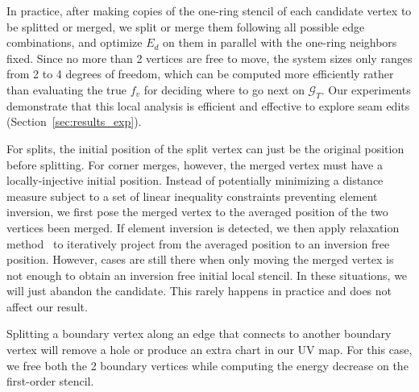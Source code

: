 In practice, after making copies of the one-ring stencil of each candidate vertex to be splitted or merged, we split or merge them following all possible edge combinations, and optimize $E_d$ on them in parallel with the one-ring neighbors fixed. Since no more than 2 vertices are free to move, the system sizes only ranges from 2 to 4 degrees of freedom, which can be computed more efficiently rather than evaluating the true $f_v$ for deciding where to go next on $\mathcal{G}_T$. Our experiments demonstrate that this local analysis is efficient and effective to explore seam edits (Section~\ref{sec:results_exp}).

For splits, the initial position of the split vertex can just be the original position before splitting. For corner merges, however, the merged vertex must have a locally-injective initial position. Instead of potentially minimizing a distance measure subject to a set of linear inequality constraints preventing element inversion, we first pose the merged vertex to the averaged position of the two vertices been merged. If element inversion is detected, we then apply relaxation method~\cite{Agmon1954Relaxation} to iteratively project from the averaged position to an inversion free position. However, cases are still there when only moving the merged vertex is not enough to obtain an inversion free initial local stencil. In these situations, we will just abandon the candidate. This rarely happens in practice and does not affect our result.

Splitting a boundary vertex along an edge that connects to another boundary vertex will remove a hole or produce an extra chart in our UV map. For this case, we free both the 2 boundary vertices while computing the energy decrease on the first-order stencil. 
